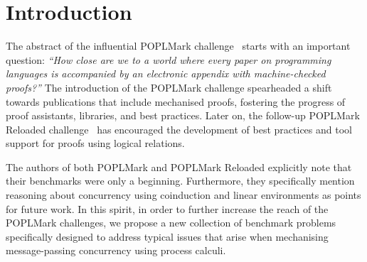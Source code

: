 \documentclass[runningheads]{llncs}
\begin{document}
\section{Introduction}
The abstract of the influential POPLMark challenge~\cite{POPLMark} starts with
an important question: \emph{``How close are we to a world where every paper on
programming languages is accompanied by an electronic appendix with
machine-checked proofs?''} The introduction of the POPLMark
challenge spearheaded a shift towards publications that include
mechanised proofs, fostering the progress of proof assistants,
libraries, and best practices.  Later on, the follow-up POPLMark
Reloaded challenge~\cite{POPLMarkReloaded} has encouraged the development of
best practices and tool support for proofs using logical relations.

The authors of both POPLMark and POPLMark Reloaded explicitly
note that their benchmarks were only a beginning.  Furthermore, they
specifically mention reasoning about concurrency using coinduction and
linear environments as points for future work.  In this spirit, in order to
further increase the reach of the POPLMark challenges, we propose a new
collection of benchmark problems specifically designed to address typical issues
that arise when mechanising message-passing concurrency using process calculi.
\end{document}
